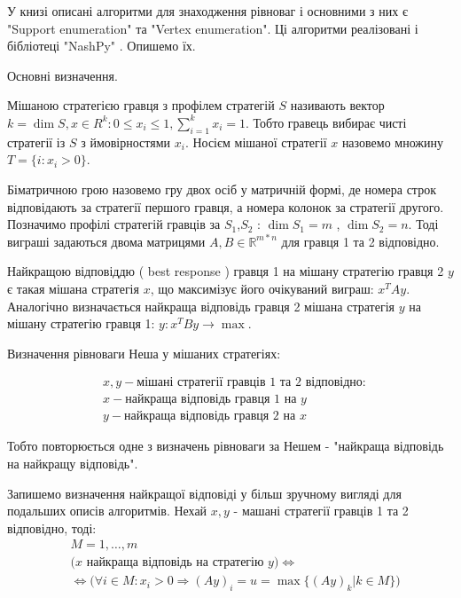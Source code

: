 У книзі \cite{AlgoGameTheory} описані алгоритми для знаходження рівноваг і основними з них є "Support enumeration" та "Vertex enumeration". Ці алгоритми реалізовані і бібліотеці "NashPy" \cite{NashPy}. Опишемо їх.

Основні визначення.

Мішаною стратегією гравця з профілем стратегій $S$ називають вектор $k = \dim S, x \in R^{k} : 0 \le x_i \le 1, \sum_{i=1}^{k} x_i = 1$. Тобто гравець вибирає чисті стратегії із $S$ з ймовірностями $x_i$. Носієм мішаної стратегії $x$ назовемо множину $T=\{ i: x_i > 0\}$.

Біматричною грою назовемо гру двох осіб у матричній формі, де номера строк відповідають за стратегії першого гравця, а номера колонок за стратегії другого. Позначимо профілі стратегій гравців за $S_1$,$S_2$ : $\dim {S_1} = m$ , $\dim {S_2} = n$. Тоді виграші задаються двома матрицями $A,B \in \mathbb{R}^{m*n}$ для гравця 1 та 2 відповідно.

Найкращою відповіддю ( best response ) гравця 1 на мішану стратегію гравця 2 $y$ є такая мішана стратегія $x$, що максимізує його очікуваний виграш: $x^TAy$. Аналогічно визначається найкраща відповідь гравця 2 мішана стратегія $y$ на мішану стратегію гравця 1: $y: x^TBy \rightarrow \max$.

Визначення рівноваги Неша у мішаних стратегіях:

\begin{equation}
	\begin{aligned}
		& x,y - \textrm{мішані стратегії гравців 1 та 2 відповідно}: \\
		& x - \textrm{найкраща відповідь гравця 1 на } y \\
		& y - \textrm{найкраща відповідь гравця 2 на } x
	\end{aligned}
\end{equation}

Тобто повторюється одне з визначень рівноваги за Нешем - "найкраща відповідь на найкращу відповідь".

Запишемо визначення найкращої відповіді у більш зручному вигляді для подальших описів алгоритмів. Нехай $x,y$ - машані стратегії гравців 1 та 2 відповідно, тоді:
\begin{equation}
	\begin{aligned}
		& M = {1,\ldots,m} \\
		& \bigg( x \textrm{ найкраща відповідь на стратегію } y  \bigg)\Leftrightarrow \\
		& \Leftrightarrow \bigg( \forall i \in M: x_i > 0 \Rightarrow (Ay)_i = u = \max\{(Ay)_k | k \in M\} \bigg)
	\end{aligned}
	\label{eq:best_response}
\end{equation}

